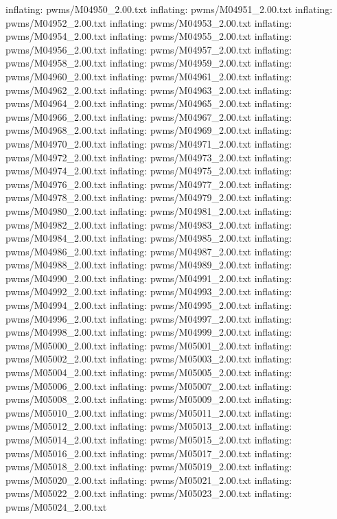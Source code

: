 \documentclass[letterpaper,10pt,english]{sphinxmanual}
\begin{document}
{\begin{sphinxVerbatim}[commandchars=\\\{\}]
  inflating: pwms/M04950\_2.00.txt
  inflating: pwms/M04951\_2.00.txt
  inflating: pwms/M04952\_2.00.txt
  inflating: pwms/M04953\_2.00.txt
  inflating: pwms/M04954\_2.00.txt
  inflating: pwms/M04955\_2.00.txt
  inflating: pwms/M04956\_2.00.txt
  inflating: pwms/M04957\_2.00.txt
  inflating: pwms/M04958\_2.00.txt
  inflating: pwms/M04959\_2.00.txt
  inflating: pwms/M04960\_2.00.txt
  inflating: pwms/M04961\_2.00.txt
  inflating: pwms/M04962\_2.00.txt
  inflating: pwms/M04963\_2.00.txt
  inflating: pwms/M04964\_2.00.txt
  inflating: pwms/M04965\_2.00.txt
  inflating: pwms/M04966\_2.00.txt
  inflating: pwms/M04967\_2.00.txt
  inflating: pwms/M04968\_2.00.txt
  inflating: pwms/M04969\_2.00.txt
  inflating: pwms/M04970\_2.00.txt
  inflating: pwms/M04971\_2.00.txt
  inflating: pwms/M04972\_2.00.txt
  inflating: pwms/M04973\_2.00.txt
  inflating: pwms/M04974\_2.00.txt
  inflating: pwms/M04975\_2.00.txt
  inflating: pwms/M04976\_2.00.txt
  inflating: pwms/M04977\_2.00.txt
  inflating: pwms/M04978\_2.00.txt
  inflating: pwms/M04979\_2.00.txt
  inflating: pwms/M04980\_2.00.txt
  inflating: pwms/M04981\_2.00.txt
  inflating: pwms/M04982\_2.00.txt
  inflating: pwms/M04983\_2.00.txt
  inflating: pwms/M04984\_2.00.txt
  inflating: pwms/M04985\_2.00.txt
  inflating: pwms/M04986\_2.00.txt
  inflating: pwms/M04987\_2.00.txt
  inflating: pwms/M04988\_2.00.txt
  inflating: pwms/M04989\_2.00.txt
  inflating: pwms/M04990\_2.00.txt
  inflating: pwms/M04991\_2.00.txt
  inflating: pwms/M04992\_2.00.txt
  inflating: pwms/M04993\_2.00.txt
  inflating: pwms/M04994\_2.00.txt
  inflating: pwms/M04995\_2.00.txt
  inflating: pwms/M04996\_2.00.txt
  inflating: pwms/M04997\_2.00.txt
  inflating: pwms/M04998\_2.00.txt
  inflating: pwms/M04999\_2.00.txt
  inflating: pwms/M05000\_2.00.txt
  inflating: pwms/M05001\_2.00.txt
  inflating: pwms/M05002\_2.00.txt
  inflating: pwms/M05003\_2.00.txt
  inflating: pwms/M05004\_2.00.txt
  inflating: pwms/M05005\_2.00.txt
  inflating: pwms/M05006\_2.00.txt
  inflating: pwms/M05007\_2.00.txt
  inflating: pwms/M05008\_2.00.txt
  inflating: pwms/M05009\_2.00.txt
  inflating: pwms/M05010\_2.00.txt
  inflating: pwms/M05011\_2.00.txt
  inflating: pwms/M05012\_2.00.txt
  inflating: pwms/M05013\_2.00.txt
  inflating: pwms/M05014\_2.00.txt
  inflating: pwms/M05015\_2.00.txt
  inflating: pwms/M05016\_2.00.txt
  inflating: pwms/M05017\_2.00.txt
  inflating: pwms/M05018\_2.00.txt
  inflating: pwms/M05019\_2.00.txt
  inflating: pwms/M05020\_2.00.txt
  inflating: pwms/M05021\_2.00.txt
  inflating: pwms/M05022\_2.00.txt
  inflating: pwms/M05023\_2.00.txt
  inflating: pwms/M05024\_2.00.txt

\end{sphinxVerbatim}}
\end{document}
